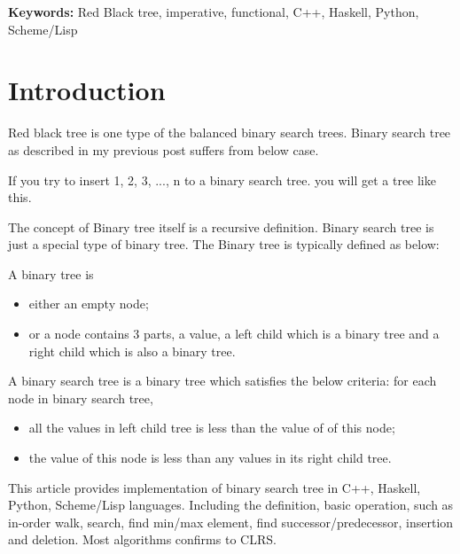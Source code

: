 \documentclass{article}
\begin{document}
\vspace{3cm}
{\bfseries Keywords:} Red Black tree, imperative, functional, C++, Haskell, Python, Scheme/Lisp


\maketitle

\section{Introduction}
\label{introduction}

Red black tree is one type of the balanced binary search trees. Binary search tree as described
in my previous post\cite{bst-lxy} suffers from below case.

If you try to insert 1, 2, 3, ..., n to a binary search tree. you will get a tree like this.


The concept of Binary tree itself is a recursive definition. Binary search tree is just a special type of
binary tree. The Binary tree is typically defined as below:

A binary tree is 
\begin{itemize}
\item either an empty node;
\item or a node contains 3 parts, a value, a left child which is a binary tree and a right child which is also a binary tree.
\end{itemize}

A binary search tree is a binary tree which satisfies the below criteria:
for each node in binary search tree,
\begin{itemize}
\item all the values in left child tree is less than the value of of this node;
\item the value of this node is less than any values in its right child tree.
\end{itemize}

This article provides implementation of binary search tree in C++, Haskell, Python, 
Scheme/Lisp languages. Including the definition, basic operation, such as
in-order walk, search, find min/max element, find successor/predecessor, insertion
and deletion. Most algorithms confirms to CLRS\cite{CLRS}.
\end{document}
